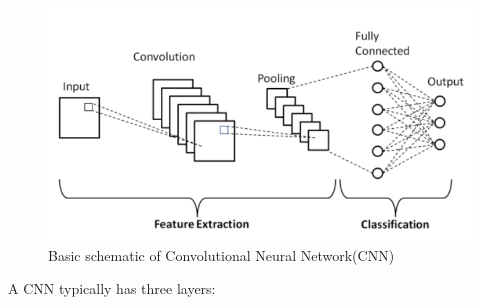 \begin{figure}[tbh] %
\begin{center}
	\includegraphics[width = 5in]{images/cnn.png}
	\caption{Basic schematic of Convolutional Neural Network(CNN)} %
	\label{figStructure of Neural Network} %
\end{center}
\end{figure}

A CNN typically has three layers:

